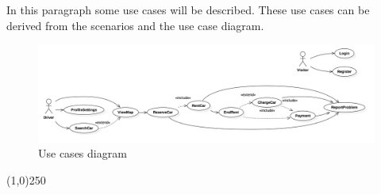 In this paragraph some use cases will be described. These use cases can be derived from the scenarios and the use case diagram.

\begin{figure}[h]
   \begin{center}
    \includegraphics[width=\textwidth]{Resources/UseCaseModel.png}
    \caption{Use cases diagram}
   \end{center}
    \label{fig:UseCasesDiagram}
\end{figure}

\begin{center}
\line(1,0){250}
\end{center}

